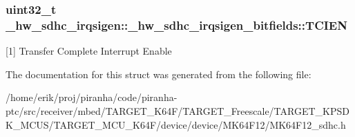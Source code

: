 \subsubsection[{\texorpdfstring{T\+C\+I\+EN}{TCIEN}}]{\setlength{\rightskip}{0pt plus 5cm}uint32\+\_\+t \+\_\+hw\+\_\+sdhc\+\_\+irqsigen\+::\+\_\+hw\+\_\+sdhc\+\_\+irqsigen\+\_\+bitfields\+::\+T\+C\+I\+EN}\hypertarget{struct__hw__sdhc__irqsigen_1_1__hw__sdhc__irqsigen__bitfields_a81dc90db86a7de9e6db7fa446215102e}{}\label{struct__hw__sdhc__irqsigen_1_1__hw__sdhc__irqsigen__bitfields_a81dc90db86a7de9e6db7fa446215102e}
\mbox{[}1\mbox{]} Transfer Complete Interrupt Enable 

The documentation for this struct was generated from the following file\+:\begin{DoxyCompactItemize}
\item 
/home/erik/proj/piranha/code/piranha-\/ptc/src/receiver/mbed/\+T\+A\+R\+G\+E\+T\+\_\+\+K64\+F/\+T\+A\+R\+G\+E\+T\+\_\+\+Freescale/\+T\+A\+R\+G\+E\+T\+\_\+\+K\+P\+S\+D\+K\+\_\+\+M\+C\+U\+S/\+T\+A\+R\+G\+E\+T\+\_\+\+M\+C\+U\+\_\+\+K64\+F/device/device/\+M\+K64\+F12/M\+K64\+F12\+\_\+sdhc.\+h\end{DoxyCompactItemize}
